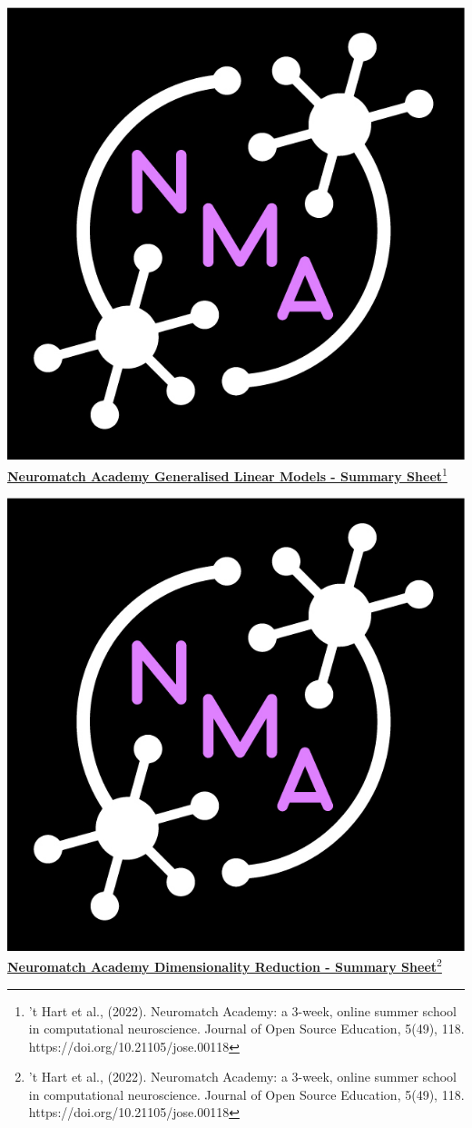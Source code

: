 \documentclass[10pt,a4paper]{article}
\begin{document}
\includegraphics[scale=0.1]{Figures/nma-logo-square-4xp.jpeg}\href{https://compneuro.neuromatch.io/tutorials/intro.html}{\textbf{\Huge{Neuromatch Academy Generalised Linear Models - Summary Sheet}}\footnote{’t Hart et al., (2022). Neuromatch Academy: a 3-week, online summer school in computational neuroscience. Journal of Open Source Education, 5(49), 118. https://doi.org/10.21105/jose.00118}}
\begin{multicols}{3}


\end{multicols}
\newpage
\includegraphics[scale=0.1]{Figures/nma-logo-square-4xp.jpeg}\href{https://compneuro.neuromatch.io/tutorials/intro.html}{\textbf{\Huge{Neuromatch Academy Dimensionality Reduction - Summary Sheet}}\footnote{’t Hart et al., (2022). Neuromatch Academy: a 3-week, online summer school in computational neuroscience. Journal of Open Source Education, 5(49), 118. https://doi.org/10.21105/jose.00118}}
\end{document}
